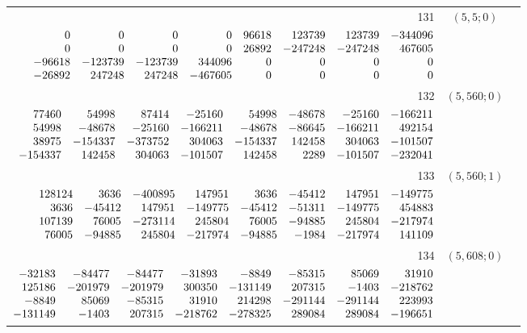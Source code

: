 \documentclass[11pt]{article}
\theoremstyle{remark}
\numberwithin{equation}{section}
\begin{document}
\begin{longtable}{rcl}
131 & $(5,5;0)$ & \begin{tabular}[t]{@{}l@{}}$w_i=\displaystyle \frac{69885431881186891}{377421415292840495104000000000000000}$\\[3pt]{\scriptsize$\begin{array}{@{}rrrrrrrr@{}}0 & 0 & 0 & 0 & 96618 & 123739 & 123739 & -344096\\0 & 0 & 0 & 0 & 26892 & -247248 & -247248 & 467605\\-96618 & -123739 & -123739 & 344096 & 0 & 0 & 0 & 0\\-26892 & 247248 & 247248 & -467605 & 0 & 0 & 0 & 0\end{array}$}\end{tabular}\\[8pt]
132 & $(5,560;0)$ & \begin{tabular}[t]{@{}l@{}}$w_i=\displaystyle \frac{729552130954857259}{3134532397968187055040000000000000000}$\\[3pt]{\scriptsize$\begin{array}{@{}rrrrrrrr@{}}77460 & 54998 & 87414 & -25160 & 54998 & -48678 & -25160 & -166211\\54998 & -48678 & -25160 & -166211 & -48678 & -86645 & -166211 & 492154\\38975 & -154337 & -373752 & 304063 & -154337 & 142458 & 304063 & -101507\\-154337 & 142458 & 304063 & -101507 & 142458 & 2289 & -101507 & -232041\end{array}$}\end{tabular}\\[8pt]
133 & $(5,560;1)$ & \begin{tabular}[t]{@{}l@{}}$w_i=\displaystyle \frac{58263927244992003}{1827453857029607142755840000000000000}$\\[3pt]{\scriptsize$\begin{array}{@{}rrrrrrrr@{}}128124 & 3636 & -400895 & 147951 & 3636 & -45412 & 147951 & -149775\\3636 & -45412 & 147951 & -149775 & -45412 & -51311 & -149775 & 454883\\107139 & 76005 & -273114 & 245804 & 76005 & -94885 & 245804 & -217974\\76005 & -94885 & 245804 & -217974 & -94885 & -1984 & -217974 & 141109\end{array}$}\end{tabular}\\[8pt]
134 & $(5,608;0)$ & \begin{tabular}[t]{@{}l@{}}$w_i=\displaystyle \frac{853536994858899983}{2171271632699596316800000000000000000}$\\[3pt]{\scriptsize$\begin{array}{@{}rrrrrrrr@{}}-32183 & -84477 & -84477 & -31893 & -8849 & -85315 & 85069 & 31910\\125186 & -201979 & -201979 & 300350 & -131149 & 207315 & -1403 & -218762\\-8849 & 85069 & -85315 & 31910 & 214298 & -291144 & -291144 & 223993\\-131149 & -1403 & 207315 & -218762 & -278325 & 289084 & 289084 & -196651\end{array}$}\end{tabular}\\[8pt]

\end{longtable}
\end{document}
